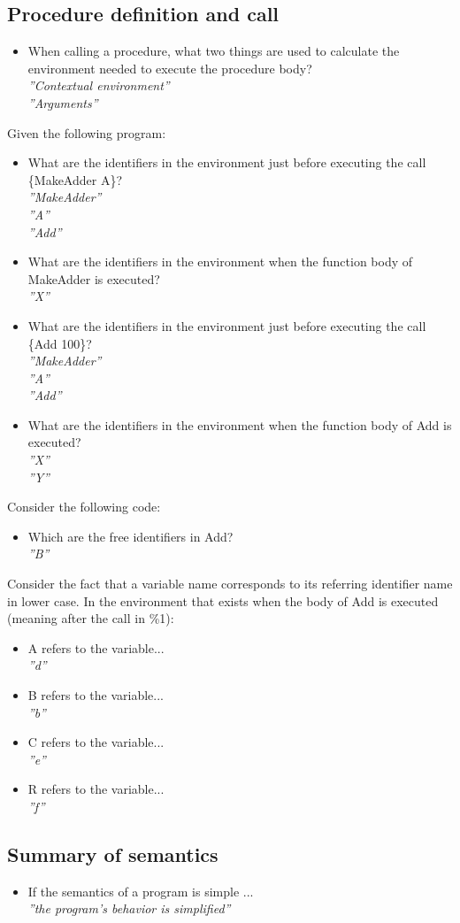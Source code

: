 \documentclass[fr,license=none]{../../../eplsummary}
\begin{document}
		\subsection{Procedure definition and call}
			\begin{itemize}
				\item When calling a procedure, what two things are used to calculate the environment needed to execute the procedure body?\\
					\textit{''Contextual environment''}\\
					\textit{''Arguments''}
			\end{itemize}
			Given the following program:
			
			\begin{itemize}
				\item What are the identifiers in the environment just before executing the call \{MakeAdder A\}?\\
					\textit{''MakeAdder''}\\
					\textit{''A''}\\
					\textit{''Add''}
				\item What are the identifiers in the environment when the function body of MakeAdder is executed?\\
					\textit{''X''}
				\item What are the identifiers in the environment just before executing the call \{Add 100\}?\\
					\textit{''MakeAdder''}\\
					\textit{''A''}\\
					\textit{''Add''}
				\item What are the identifiers in the environment when the function body of Add is executed?\\
					\textit{''X''}\\
					\textit{''Y''}
			\end{itemize}
			Consider the following code:
			
			\begin{itemize}
				\item Which are the free identifiers in Add?\\
					\textit{''B''}
			\end{itemize}
			Consider the fact that a variable name corresponds to its referring identifier name in lower case.
			In the environment that exists when the body of Add is executed (meaning after the call in \%1):
			\begin{itemize}
				\item A refers to the variable...\\
					\textit{''d''}
				\item B refers to the variable...\\
					\textit{''b''}
				\item C refers to the variable...\\
					\textit{''e''}
				\item R refers to the variable...\\
					\textit{''f''}
			\end{itemize}
		\subsection{Summary of semantics}
			\begin{itemize}
				\item If the semantics of a program is simple ...\\
					\textit{''the program's behavior is simplified''}
			\end{itemize}
\end{document}
